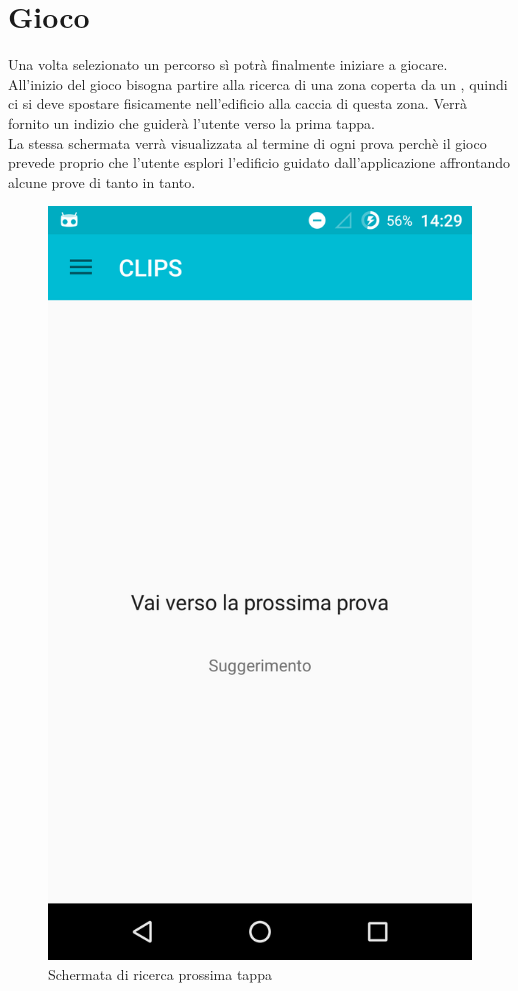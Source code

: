 \section{Gioco}
Una volta selezionato un percorso sì potrà finalmente iniziare a giocare. \\
All'inizio del gioco bisogna partire alla ricerca di una zona coperta da un , quindi ci si deve spostare fisicamente nell'edificio alla caccia di questa zona. Verrà fornito un indizio che guiderà l'utente verso la prima tappa. \\
La stessa schermata verrà visualizzata al termine di ogni prova perchè il gioco prevede proprio che l'utente esplori l'edificio guidato dall'applicazione affrontando alcune prove di tanto in tanto.

\begin{figure}[!h]
	\centering
	\includegraphics[scale=0.15]{screenshot/cerca_prossima_tappa}
	\caption{Schermata di ricerca prossima tappa}
\end{figure}

